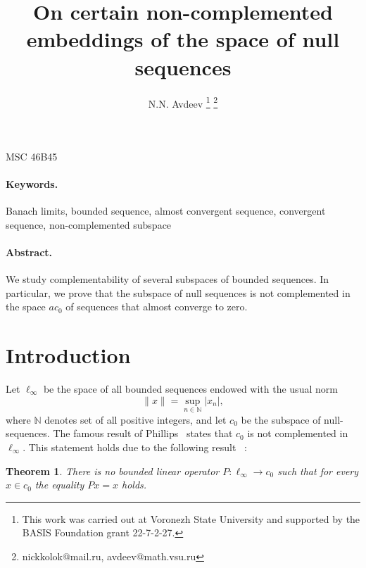 \documentclass[a4paper,10pt]{article} %
\theoremstyle{plain}
\newtheorem{theorem}{Theorem}[section]
\theoremstyle{definition}
\begin{document}

\title{
	On certain non-complemented embeddings of the space of null sequences
}

\author{
	N.N. Avdeev
	\footnote{
		This work was carried out at Voronezh State University and supported by the BASIS
		Foundation grant 22-7-2-27.
	}
	\footnote{nickkolok@mail.ru, avdeev@math.vsu.ru}
}

\maketitle

MSC 46B45

\paragraph{Keywords.}
	Banach limits,
	bounded sequence,
	almost convergent sequence,
	convergent sequence,
	non-complemented subspace


\paragraph{Abstract.}
We study complementability of several subspaces of bounded sequences.
In particular,
we prove that the subspace of null sequences
is not complemented in the space $ac_0$ of sequences that almost converge to zero.





\section{Introduction}

Let $\ell_\infty$ be the space of all bounded sequences
endowed with the usual norm
\begin{equation}
	\|x\| = \sup_{n\in\mathbb{N}} |x_n|
	,
\end{equation}
where $\mathbb{N}$ denotes set of all positive integers,
and let $c_0$ be the subspace  of null-sequences.
The famous result of Phillips~\cite{phillips1940linear}
states that $c_0$ is not complemented in $\ell_\infty$.
This statement holds due to the following result~\cite{phillips1940linear} :

\begin{theorem}
	\label{thm:phillips}
	There is no bounded linear operator $P: \ell_\infty \to c_0$ such that for every
	$x \in c_0$ the equality $Px =x$ holds.
\end{theorem}
\end{document}
